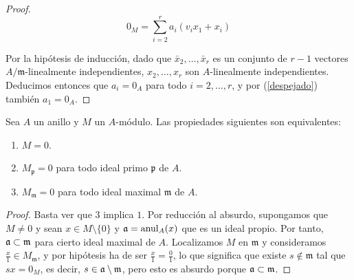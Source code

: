 \documentclass[../main.tex]{subfiles}
\begin{document}
\begin{proof}
$$
0_M = \sum_{i=2}^r a_i(v_ix_1+x_i)
$$

Por la hipótesis de inducción, dado que $\bar x_2, \dots, \bar x_r$ es un conjunto de $r-1$ vectores $A/\mathfrak{m}$-linealmente independientes, $ x_2, \dots, x_r$ son $A$-linealmente independientes. Deducimos entonces que $a_i=0_A$ para todo $i=2,\dots,r$, y por (\ref{despejado}) también $a_1 = 0_A$.

\end{proof}

\begin{proposition}
Sea $A$ un anillo y $M$ un $A$-módulo. Las propiedades siguientes son equivalentes:
\begin{enumerate}
	\item $M= 0$.
	\item $M_\mathfrak{p} = 0$ para todo ideal primo $\mathfrak{p}$ de $A$.
	\item $M_{\mathfrak{m}} = 0$ para todo ideal maximal $\mathfrak{m}$ de $A$.
\end{enumerate}
\end{proposition}
\begin{proof}
	Basta ver que $3$ implica $1$. Por reducción al absurdo, supongamos que $M\neq 0$ y sean $x\in M \setminus \{0\}$ y $\mathfrak{a} = \operatorname{anul}_A(x)$ que es un ideal propio. Por tanto, $\mathfrak{a} \subset \mathfrak{m}$ para cierto ideal maximal de $A$.
	Localizamos $M$ en $\mathfrak{m}$ y consideramos $\frac{x}{1}\in M_\mathfrak{m}$, y por hipótesis ha de ser $\frac{x}{1}=\frac{0}{1}$, lo que significa que existe $s\not\in \mathfrak{m}$ tal que $sx = 0_{M}$, es decir, $s\in \mathfrak{a} \setminus \mathfrak{m}$, pero esto es absurdo porque $\mathfrak{a} \subset \mathfrak{m}$. 
\end{proof}
\end{document}
